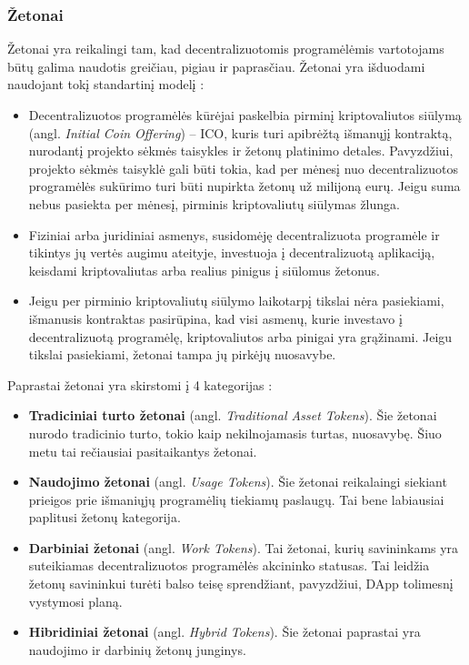 \documentclass{VUMIFPSkursinis}
\begin{document}
\subsubsection{Žetonai}
Žetonai yra reikalingi tam, kad decentralizuotomis programėlėmis vartotojams būtų galima naudotis greičiau, pigiau ir paprasčiau. Žetonai yra išduodami naudojant tokį standartinį modelį \cite{catalini2018initial}:
\begin{itemize}
    \item Decentralizuotos programėlės kūrėjai paskelbia pirminį kriptovaliutos siūlymą (angl. \textit{Initial Coin Offering}) – ICO, kuris turi apibrėžtą išmanųjį kontraktą, nurodantį projekto sėkmės taisykles ir žetonų platinimo detales. Pavyzdžiui, projekto sėkmės taisyklė gali būti tokia, kad per mėnesį nuo decentralizuotos programėlės sukūrimo turi būti nupirkta žetonų už milijoną eurų. Jeigu suma nebus pasiekta per mėnesį, pirminis kriptovaliutų siūlymas žlunga.
    \item Fiziniai arba juridiniai asmenys, susidomėję decentralizuota programėle ir tikintys jų vertės augimu ateityje, investuoja į decentralizuotą aplikaciją, keisdami kriptovaliutas arba realius pinigus į siūlomus žetonus.
    \item Jeigu per pirminio kriptovaliutų siūlymo laikotarpį tikslai nėra pasiekiami, išmanusis kontraktas pasirūpina, kad visi asmenų, kurie investavo į decentralizuotą programėlę, kriptovaliutos arba pinigai yra grąžinami. Jeigu tikslai pasiekiami, žetonai tampa jų pirkėjų nuosavybe.
\end{itemize}
Paprastai žetonai yra skirstomi į 4 kategorijas \cite{pietrewicz2017emerging}:
\begin{itemize}
    \item \textbf{Tradiciniai turto žetonai} (angl. \textit{Traditional Asset Tokens}). Šie žetonai nurodo tradicinio turto, tokio kaip nekilnojamasis turtas, nuosavybę. Šiuo metu tai rečiausiai pasitaikantys žetonai.
    \item \textbf{Naudojimo žetonai} (angl. \textit{Usage Tokens}). Šie žetonai reikalaingi siekiant prieigos prie išmaniųjų programėlių tiekiamų paslaugų. Tai bene labiausiai paplitusi žetonų kategorija.
    \item \textbf{Darbiniai žetonai} (angl. \textit{Work Tokens}). Tai žetonai, kurių savininkams yra suteikiamas decentralizuotos programėlės akcininko statusas. Tai leidžia žetonų savininkui turėti balso teisę sprendžiant, pavyzdžiui, DApp tolimesnį vystymosi planą.
    \item \textbf{Hibridiniai žetonai} (angl. \textit{Hybrid Tokens}). Šie žetonai paprastai yra naudojimo ir darbinių žetonų junginys.
\end{itemize}
\end{document}
